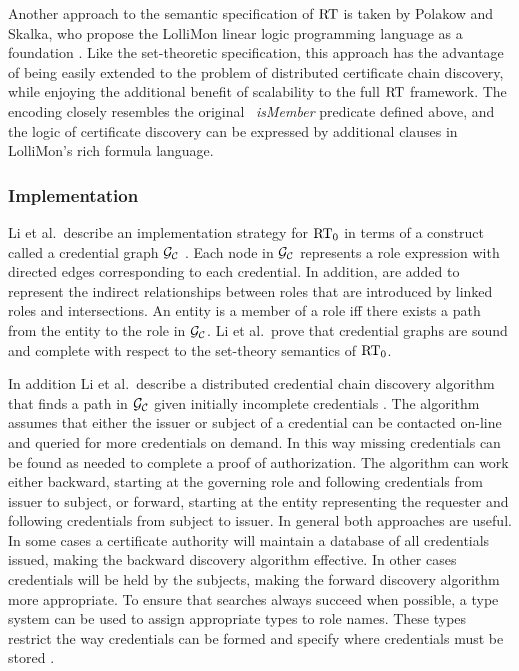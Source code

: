Another approach to the semantic specification of $\text{RT}$ is taken by
Polakow and Skalka, who propose the LolliMon linear logic programming
language as a foundation \cite{polakow-skalka-plas06}.  Like the
set-theoretic specification, this approach has the advantage of being
easily extended to the problem of distributed certificate chain
discovery, while enjoying the additional benefit of scalability to the
full $\text{RT}$ framework.  The encoding closely resembles the original
\datalog\  \textit{isMember} predicate defined above, and the logic 
of certificate discovery can be expressed by additional clauses in
LolliMon's rich formula language.

\subsubsection{Implementation}

Li et al.~describe an implementation strategy for $\text{RT}_0$ in terms of a
construct called a credential graph $\mathcal{G}_{\mathcal{C}}$ \cite{Li:DCDTM}.
Each node in $\mathcal{G}_{\mathcal{C}}$ represents a role expression with
directed edges corresponding to each credential. In addition,
 are added to represent the indirect relationships
between roles that are introduced by linked roles and intersections. An
entity is a member of a role iff there exists a path from the entity to the
role in $\mathcal{G}_{\mathcal{C}}$. Li et al.~prove that credential
graphs are sound and complete with respect to the set-theory semantics of
$\text{RT}_0$.

In addition Li et al.~describe a distributed credential chain discovery
algorithm that finds a path in $\mathcal{G}_{\mathcal{C}}$ given initially incomplete
credentials \cite{Li:DCDTM}. The algorithm assumes that either the issuer or
subject of a credential can be contacted on-line and queried for more
credentials on demand. In this way missing credentials can be found as needed
to complete a proof of authorization. The algorithm can work either backward,
starting at the governing role and following credentials from issuer to
subject, or forward, starting at the entity representing the requester and
following credentials from subject to issuer. In general both approaches are
useful. In some cases a certificate authority will maintain a database of all
credentials issued, making the backward discovery algorithm effective. In
other cases credentials will be held by the subjects, making the forward
discovery algorithm more appropriate. To ensure that searches always succeed
when possible, a type system can be used to assign appropriate types to role
names. These types restrict the way credentials can be formed and specify
where credentials must be stored \cite{Li:DCDTM}.

